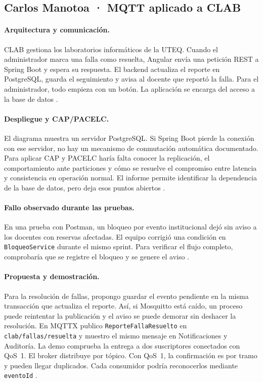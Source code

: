 
\subsection{Carlos Manotoa · MQTT aplicado a CLAB}

\paragraph{Arquitectura y comunicación.}
CLAB gestiona los laboratorios informáticos de la UTEQ. Cuando el
administrador marca una falla como resuelta, Angular envía una petición REST a
Spring Boot y espera su respuesta. El backend actualiza el reporte en
PostgreSQL, guarda el seguimiento y avisa al docente que reportó la falla.
Para el administrador, todo empieza con un botón. La aplicación se encarga del
acceso a la base de datos \cite[sección~3.2 y caso CU-04]{clab2026}.

\paragraph{Despliegue y CAP/PACELC.}
El diagrama muestra un servidor PostgreSQL. Si Spring Boot pierde la conexión
con ese servidor, no hay un mecanismo de conmutación automática documentado.
Para aplicar CAP y PACELC haría falta conocer la replicación, el comportamiento
ante particiones y cómo se resuelve el compromiso entre latencia y consistencia
en operación normal. El informe permite identificar la dependencia de la base
de datos, pero deja esos puntos abiertos \cite[figura~4]{clab2026}.

\paragraph{Fallo observado durante las pruebas.}
En una prueba con Postman, un bloqueo por evento institucional dejó sin aviso
a los docentes con reservas afectadas. El equipo corrigió una condición en
\texttt{BloqueoService} durante el mismo sprint. Para verificar el flujo
completo, comprobaría que se registre el bloqueo y se genere el aviso \cite[sección~6.5.2]{clab2026}.

\paragraph{Propuesta y demostración.}
Para la resolución de fallas, propongo guardar el evento pendiente en la misma
transacción que actualiza el reporte. Así, si Mosquitto está caído, un proceso
puede reintentar la publicación y el aviso se puede demorar sin deshacer la
resolución. En MQTTX publico \texttt{ReporteFallaResuelto} en
\texttt{clab/fallas/resuelta} y muestro el mismo mensaje en Notificaciones y
Auditoría. La demo comprueba la entrega a dos suscriptores conectados con QoS~1.
El broker distribuye por tópico. Con QoS~1, la confirmación es por tramo y
pueden llegar duplicados. Cada consumidor podría reconocerlos mediante
\texttt{eventoId} \cite{mqtt2019}.

